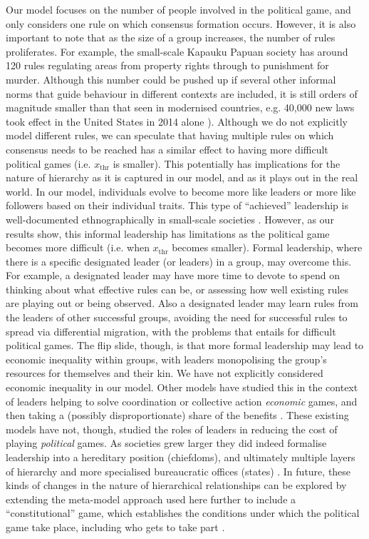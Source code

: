 \documentclass{rstb}
\begin{document}
\begin{linenumbers}
Our model focuses on the number of people involved in the political game, and only considers one rule on which consensus formation occurs. However, it is also important to note that as the size of a group increases, the number of rules proliferates. For example, the small-scale Kapauku Papuan society has around 120 rules regulating areas from property rights through to punishment for murder. Although this number could be pushed up if several other informal norms that guide behaviour in different contexts are included, it is still orders of magnitude smaller than that seen in modernised countries, e.g. 40,000 new laws took effect in the United States in 2014 alone \cite{Singh:2017:a}). Although we do not explicitly model different rules, we can speculate that having multiple rules on which consensus needs to be reached has a similar effect to having more difficult political games (i.e. $x_\mathrm{thr}$ is smaller). This potentially has implications for the nature of hierarchy as it is captured in our model, and as it plays out in the real world. In our model, individuals evolve to become more like leaders or more like followers based on their individual traits. This type of ``achieved'' leadership is well-documented ethnographically in small-scale societies \cite{vonReuden:2015:a}. However, as our results show, this informal leadership has limitations as the political game becomes more difficult (i.e. when $x_\mathrm{thr}$ becomes smaller). Formal leadership, where there is a specific designated leader (or leaders) in a group, may overcome this. For example, a designated leader may have more time to devote to spend on thinking about what effective rules can be, or assessing how well existing rules are playing out or being observed. Also a designated leader may learn rules from the leaders of other successful groups, avoiding the need for successful rules to spread via differential migration, with the problems that entails for difficult political games. The flip slide, though, is that more formal leadership may lead to economic inequality within groups, with leaders monopolising the group's resources for themselves and their kin. We have not explicitly considered economic inequality in our model. Other models have studied this in the context of leaders helping to solve coordination or collective action \emph{economic} games, and then taking a (possibly disproportionate) share of the benefits \cite{Hooper:2010:a,Powers:2014:a,Gavrilets:2014:a}. These existing models have not, though, studied the roles of leaders in reducing the cost of playing \emph{political} games. As societies grew larger they did indeed formalise leadership into a hereditary position (chiefdoms), and ultimately multiple layers of hierarchy and more specialised bureaucratic offices (states) \cite{Spencer:2010:a}. In future, these kinds of changes in the nature of hierarchical relationships can be explored by extending the meta-model approach used here further to include a ``constitutional'' game, which establishes the conditions under which the political game take place, including who gets to take part \cite{Ostrom:1994:a,Hurwicz:1996:a,Reiter:1996:a}. 

\end{linenumbers}
\end{document}
